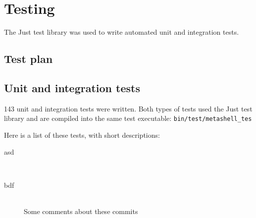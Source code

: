 
\chapter{Testing}

The Just\cite{just} test library was used to write automated unit and
integration tests.


\section{Test plan}


\section{Unit and integration tests}

143 unit and integration tests were written. Both types of tests used the Just
test library and are compiled into the same test executable:
\verb$bin/test/metashell_tes$

Here is a list of these tests, with short descriptions:

\begin{description}
    \item[asd] \hfill \\
    \item[bdf] \hfill \\
        Some comments about these commits
\end{description}

